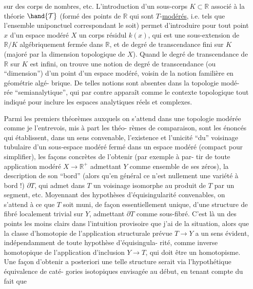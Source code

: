 
sur des corps de nombres, etc. L'introduction d'un sous-corps
$K \subset \mathbb{R}$ associé à la théorie $\hand{\mathcal{T}}$ (formé des points de $\mathbb{R}$ qui sont
$T$-\uline{modérés}, i.e. tels que l'ensemble uniponctuel correspondant le
soit) permet d'introduire pour tout point $x$ d'un espace modéré
$X$ un corps résidul $k(x)$, qui est une sous-extension de $\mathbb{R}/K$
algébriquement fermée dans $\mathbb{R}$, et de degré de transcendance fini
sur $K$ (majoré par la dimension topologique de $X$). Quand le
degré de transcendance de $\mathbb{R}$ sur $K$ est infini, on trouve une
notion de degré de transcendance (ou ``dimension'') d'un point d'un
espace modéré, voisin de la notion familière en géométrie algé-%
brique. De telles notions sont absentes dans la topologie modé-%
rée ``semianalytique'', qui par contre apparaît comme le contexte
topologique tout indiqué pour inclure les espaces analytiques réels
et complexes.

Parmi les premiers théorèmes auxquels on s'attend dans
\margin{/}une topologie modérée comme je l'entrevois, mis à part les théo-%
rèmes de comparaison, sont les énoncés qui établissent, dans un
sens convenable, l'existence et l'unicité ``du'' voisinage tubulaire
d'un sous-espace modéré fermé dans un espace modéré (compact pour
simplifier), les façons concrètes de l'obtenir (par exemple à par-%
tir de toute application modéré $X \longrightarrow \mathbb{R}^{+}$ admettant $Y$ comme
ensemble de ses zéros), la description de son ``bord'' (alors qu'en
général ce n'est nullement une variété à bord !) $\partial T$, qui admet
dans $T$ un voisinage isomorphe au produit de $T$ par un segment,
etc. Moyennant des hypothèses d'équisingularité convenables, on
s'attend à ce que $T$ soit muni, de façon essentiellement unique,
d'une structure de fibré localement trivial sur $Y$, admettant $\partial T$
comme sous-fibré. C'est là un des points les moins clairs dans
l'intuition provisoire que j'ai de la situation, alors que la
classe d'homotopie de l'application structurale prévue $T \longrightarrow Y$
a un sens évident, indépendamment de toute hypothèse d'équisingula-%
rité, comme inverse homotopique de l'application d'inclusion $Y \longrightarrow T$,
qui doit être un homotopisme. Une façon d'obtenir a posteriori
une telle structure serait via l'hypothétique équivalence de caté-%
gories isotopiques envisagée au début, en tenant compte du fait que

